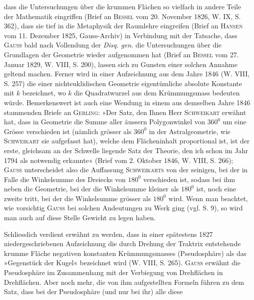 dass die Untersuchungen über die krummen Flächen so vielfach in andere Teile
der Mathematik eingriffen (Brief an \textsc{Bessel} vom 20. November 1826, W. IX,
S. 362), dass sie tief in die Metaphysik der Raumlehre eingreifen (Brief an \textsc{Hansen}
vom 11. Dezember 1825, Gauss-Archiv) in Verbindung mit der Tatsache, dass
\textsc{Gauss} bald nach Vollendung der \textit{Disq. gen.} die Untersuchungen über die
Grundlagen der Geometrie wieder aufgenommen hat (Brief an \textsc{Bessel} vom
27. Januar 1829, W. VIII, S. 200), lassen sich zu Gunsten einer solchen Annahme
geltend machen. Ferner wird in einer Aufzeichnung aus dem Jahre
1846 (W. VIII, S. 257) die einer nichteuklidischen Geometrie eigentümliche
absolute Konstante mit \(k\) bezeichnet, wo \(k\) die Quadratwurzel aus dem Krümmungsmass
bedeuten würde. Bemerkenswert ist auch eine Wendung in einem
aus demselben Jahre 1846 stammenden Briefe an \textsc{Gerling}: »Der Satz, den
Ihnen Herr \textsc{Schweikart} erwähnt hat, dass in  Geometrie die Summe
aller äussern Polygonwinkel von \(360^0\) um eine Grösse verschieden ist (nämlich
\clearpage{}\setcounter{footnote}{0}
\noindent grösser als \(360^0\) in der Astralgeometrie, wie \textsc{Schweikart} sie aufgefasst hat),
welche dem Flächeninhalt proportional ist, ist der erste, gleichsam an der
Schwelle liegende Satz der Theorie, den ich schon im Jahr 1794 als notwendig
erkannte« (Brief vom 2. Oktober 1846, W. VIII, S. 266); \textsc{Gauss} unterscheidet
also die Auffassung \textsc{Schweikarts} von der seinigen, bei der in 
Falle die Winkelsumme des Dreiecks von \(180^0\) verschieden ist, sodass bei ihm
neben die Geometrie, bei der die Winkelsumme kleiner als \(180^0\) ist, noch
eine zweite tritt, bei der die Winkelsumme grösser als \(180^0\) wird. Wenn
man beachtet, wie vorsichtig \textsc{Gauss} bei solchen Andeutungen zu Werk ging
(vgl. S. 9), so wird man auch auf diese Stelle Gewicht zu legen haben.
\par
Schliesslich verdient erwähnt zu werden, dass in einer spätestens 1827
niedergeschriebenen Aufzeichnung die durch Drehung der Traktrix entstehende
krumme Fläche negativen konstanten Krümmungsmasses (Pseudosphäre) als
das »Gegenstück der Kugel« bezeichnet wird (W. VIII, S. 265). \textsc{Gauss} erwähnt
die Pseudosphäre im Zusammenhang mit der Verbiegung von Drehflächen
in Drehflächen. Aber noch mehr, die von ihm aufgestellten Formeln
führen zu dem Satz, dass bei der Pseudosphäre (und nur bei ihr) alle diese
